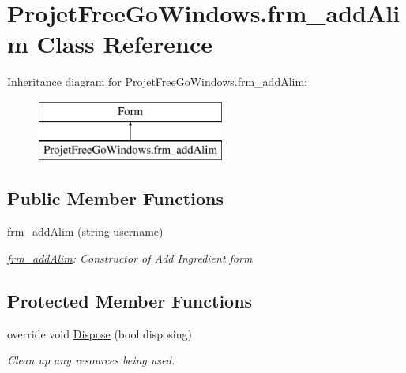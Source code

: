 \hypertarget{class_projet_free_go_windows_1_1frm__add_alim}{}\section{Projet\+Free\+Go\+Windows.\+frm\+\_\+add\+Alim Class Reference}
\label{class_projet_free_go_windows_1_1frm__add_alim}
Inheritance diagram for Projet\+Free\+Go\+Windows.\+frm\+\_\+add\+Alim\+:\begin{figure}[H]
\begin{center}
\leavevmode
\includegraphics[height=2.000000cm]{class_projet_free_go_windows_1_1frm__add_alim}
\end{center}
\end{figure}
\subsection*{Public Member Functions}
\begin{DoxyCompactItemize}
\item 
\hyperlink{class_projet_free_go_windows_1_1frm__add_alim_a5fe0d7f0ad6caf2023d5563de536cf2f}{frm\+\_\+add\+Alim} (string username)
\begin{DoxyCompactList}\small\item\em \hyperlink{class_projet_free_go_windows_1_1frm__add_alim}{frm\+\_\+add\+Alim}\+: Constructor of Add Ingredient form \end{DoxyCompactList}\end{DoxyCompactItemize}
\subsection*{Protected Member Functions}
\begin{DoxyCompactItemize}
\item 
override void \hyperlink{class_projet_free_go_windows_1_1frm__add_alim_aeeea9f3518264026c7e94b37bbc07484}{Dispose} (bool disposing)
\begin{DoxyCompactList}\small\item\em Clean up any resources being used. \end{DoxyCompactList}\end{DoxyCompactItemize}


